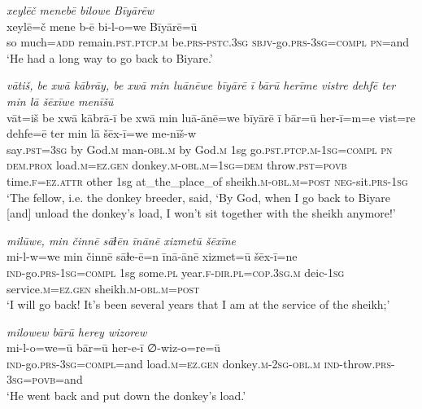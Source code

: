 \ea \label{HB.66}
\textit{xeylēč menebē bilowe Bīyārēw} \\ 
\gll xeylē=č mene b-ē bi-l-o=we Bīyārē=ū \\ 
 so much\textsc{=add} remain\textsc{.pst}\textsc{.ptcp}\textsc{.m} be\textsc{.prs}\textsc{-pstc}\textsc{.3sg} \textsc{sbjv-}go\textsc{.prs}\textsc{-3sg}\textsc{=\textsc{compl}} \textsc{pn}=and \\ 
\glt `He had a long way to go back to Biyare.'
\z 
 
\ea \label{HB.67}
\textit{vātiš, be xwā kābrāy, be xwā min luānēwe bīyārē ī bārū herīme vistre dehfē ter min lā šēxīwe menīšū} \\ 
\gll vāt=iš be xwā kābrā-ī be xwā min luā-ānē=we bīyārē ī bār=ū her-ī=m=e vist=re dehfe=ē ter min lā šēx-ī=we me-nīš-w \\ 
 say\textsc{.pst}\textsc{=3sg} by God\textsc{.m} man\textsc{-obl}\textsc{.m} by God\textsc{.m} 1sg go\textsc{.pst}\textsc{.ptcp}\textsc{.m}\textsc{-1sg}\textsc{=\textsc{compl}} \textsc{pn} \textsc{dem.prox} load\textsc{.m}\textsc{=ez}\textsc{.gen} donkey\textsc{.m}\textsc{-obl}\textsc{.m}\textsc{=1sg}\textsc{=dem} throw\textsc{.pst}\textsc{=\textsc{povb}} time\textsc{\textsc{.f}}\textsc{=ez}.\textsc{attr} other 1sg at\_the\_place\_of sheikh\textsc{.m}\textsc{-obl}\textsc{.m}\textsc{=\textsc{post}} \textsc{neg-}sit\textsc{.prs}\textsc{-1sg} \\ 
\glt `The fellow, i.e. the donkey breeder, said, ‘By God, when I go back to Biyare [and] unload the donkey’s load, I won’t sit together with the sheikh anymore!'
\z 
 
\ea \label{HB.68}
\textit{milūwe, min činnē sāɫēn īnānē xizmetū šēxīne} \\ 
\gll mi-l-w=we min činnē sāɫe-ē=n īnā-ānē xizmet=ū šēx-ī=ne \\ 
 \textsc{ind-}go\textsc{.prs}\textsc{-1sg}\textsc{=\textsc{compl}} 1sg some\textsc{.pl} year\textsc{\textsc{.f}}\textsc{-dir}\textsc{.pl}\textsc{=cop}\textsc{.3sg}\textsc{.m} deic\textsc{-1sg} service\textsc{.m}\textsc{=ez}\textsc{.gen} sheikh\textsc{.m}\textsc{-obl}\textsc{.m}\textsc{=\textsc{post}} \\ 
\glt `I will go back! It’s been several years that I am at the service of the sheikh;'
\z 
 
\ea \label{HB.72}
\textit{milowew bārū herey wizorew} \\ 
\gll mi-l-o=we=ū bār=ū her-e-ī ∅-wiz-o=re=ū \\ 
 \textsc{ind-}go\textsc{.prs}\textsc{-3sg}\textsc{=\textsc{compl}}=and load\textsc{.m}\textsc{=ez}\textsc{.gen} donkey\textsc{.m}-\textsc{2sg}\textsc{-obl}\textsc{.m} \textsc{ind-}throw\textsc{.prs}\textsc{-3sg}\textsc{=\textsc{povb}}=and \\ 
\glt `He went back and put down the donkey’s load.'
\z 
 
